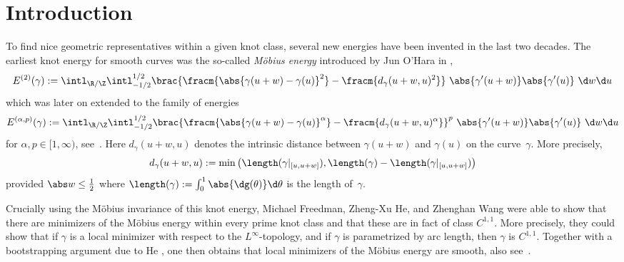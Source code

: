 \newcommand{\soln}{\gamma}
\newcommand{\solnt}{g}
\newcommand{\dsoln}{\solnt'}
\newcommand{\dsolnt}{\solnt'}
\newcommand{\soltest}{\phi}
\newcommand{\tsoltest}{{{\tilde{\phi}}}}

\newcommand{\tdim}{{n}}

\renewcommand{\g}{{\soln}}
\newcommand{\gn}{{\gamma_0}}

\section{Introduction}
To find nice geometric representatives within a given knot class, several new energies have been invented 
in the last two decades. 
The earliest knot energy for smooth curves  was the so-called \emph{M\"obius energy} introduced 
by Jun O'Hara
in \cite{OH91}, %
\[
 E^{(2)}(\soln) := \intl_{\R/\Z}\intl_{-1/{2}}^{1/{2}} 
  \brac{\fracm{\abs{\soln(u+w)-\soln(u)}^2}-\fracm{d_{\soln}(u+w,u)^2}}\ \abs{\soln'(u+w)}\abs{\soln'(u)}\ 
 \d w\d u
\]
which was later on extended to the family of energies
\[
E^{(\alpha,p)}(\soln) := \intl_{\R/\Z}\intl_{-1/{2}}^{1/{2}} 
  \brac{\fracm{\abs{\soln(u+w)-\soln(u)}^\alpha}-\fracm{d_{\soln}(u+w,u)^\alpha}}^p\ \abs{\soln'(u+w)}\abs{\soln'(u)}\ 
 \d w\d u
\]
for $\alpha, p \in [1,\infty)$, see~\cite{OHara1994}.
Here $d_\g(u+w,u)$ denotes the intrinsic distance between $\g(u+w)$ and $\g(u)$ on the curve~$\g$.
More precisely,
\begin{equation}\label{eq:intrinsic}
 d_\g(u+w,u):= \min\big(\length(\g|_{[u,u+w]}),\length(\g)-\length(\g|_{[u,u+w]})\big)
\end{equation}
provided $\abs w\le\tfrac12$ where
$%
 \length(\g) := \int_0^1 \abs{\dg(\theta)}\d\theta
$
is the length of~$\g$.


Crucially using the M\"obius invariance of this knot energy, Michael Freedman, Zheng-Xu He, and Zhenghan Wang \cite{Freedman1994} were able to show that there are minimizers of the M\"obius energy within every 
prime knot class and that these are in fact of class $C^{1,1}$. More precisely, they
could show that if $\g$ is a local minimizer with respect to the $L^\infty$-topology, and 
if $\g$ is parametrized by arc length, then $\g$ is $C^{1,1}$.
Together with a bootstrapping argument due to He \cite{He2000}, one then obtains that local 
minimizers of the M\"obius energy are smooth, also see~\cite{Reiter2009a}.

